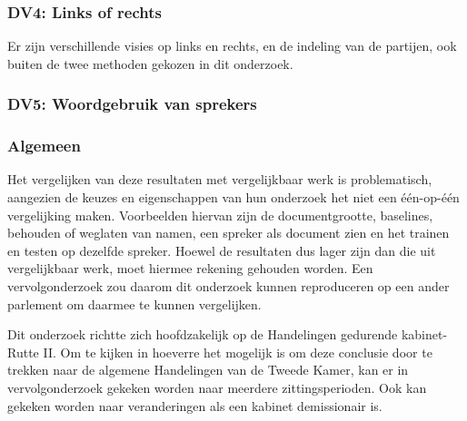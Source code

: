 \subsubsection{DV4: Links of rechts}
Er zijn verschillende visies op links en rechts, en de indeling van de partijen, ook buiten de twee methoden gekozen in dit onderzoek.\par

\subsubsection{DV5: Woordgebruik van sprekers}

\subsubsection{Algemeen}
Het vergelijken van deze resultaten met vergelijkbaar werk is problematisch, aangezien de keuzes en eigenschappen van hun onderzoek het niet een één-op-één vergelijking maken. Voorbeelden hiervan zijn de documentgrootte, baselines, behouden of weglaten van namen, een spreker als document zien en het trainen en testen op dezelfde spreker. Hoewel de resultaten dus lager zijn dan die uit vergelijkbaar werk, moet hiermee rekening gehouden worden. Een vervolgonderzoek zou daarom dit onderzoek kunnen reproduceren op een ander parlement om daarmee te kunnen vergelijken.\par
Dit onderzoek richtte zich hoofdzakelijk op de Handelingen gedurende kabinet-Rutte II. Om te kijken in hoeverre het mogelijk is om deze conclusie door te trekken naar de algemene Handelingen van de Tweede Kamer, kan er in vervolgonderzoek gekeken worden naar meerdere zittingsperioden. Ook kan gekeken worden naar veranderingen als een kabinet demissionair is.\par